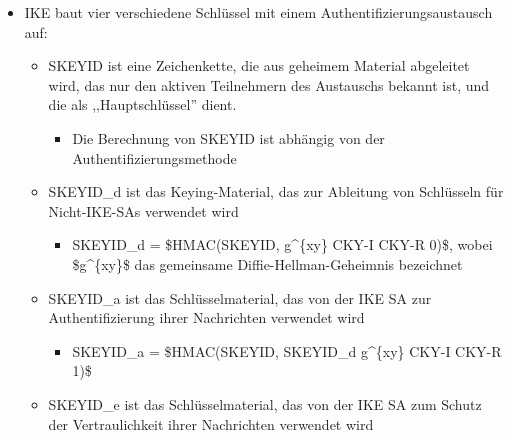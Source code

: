 \documentclass[a4paper]{article}
\begin{document}
\begin{multicols}{3}
    \begin{itemize}
        \item
              IKE baut vier verschiedene Schlüssel mit einem
              Authentifizierungsaustausch auf:

              \begin{itemize}
                  \item
                        SKEYID ist eine Zeichenkette, die aus geheimem Material abgeleitet
                        wird, das nur den aktiven Teilnehmern des Austauschs bekannt ist,
                        und die als ,,Hauptschlüssel'' dient.

                        \begin{itemize}
                            \item
                                  Die Berechnung von SKEYID ist abhängig von der
                                  Authentifizierungsmethode
                        \end{itemize}
                  \item
                        SKEYID\_d ist das Keying-Material, das zur Ableitung von Schlüsseln
                        für Nicht-IKE-SAs verwendet wird

                        \begin{itemize}
                            \item
                                  SKEYID\_d = \$HMAC(SKEYID, g\^{}\{xy\} \textbar{} CKY-I \textbar{}
                                  CKY-R \textbar{} 0)\$, wobei \$g\^{}\{xy\}\$ das gemeinsame
                                  Diffie-Hellman-Geheimnis bezeichnet
                        \end{itemize}
                  \item
                        SKEYID\_a ist das Schlüsselmaterial, das von der IKE SA zur
                        Authentifizierung ihrer Nachrichten verwendet wird

                        \begin{itemize}
                            \item
                                  SKEYID\_a = \$HMAC(SKEYID, SKEYID\_d \textbar{} g\^{}\{xy\}
                                  \textbar{} CKY-I \textbar{} CKY-R \textbar{} 1)\$
                        \end{itemize}
                  \item
                        SKEYID\_e ist das Schlüsselmaterial, das von der IKE SA zum Schutz
                        der Vertraulichkeit ihrer Nachrichten verwendet wird


\end{itemize}
\end{itemize}
\end{multicols}
\end{document}
